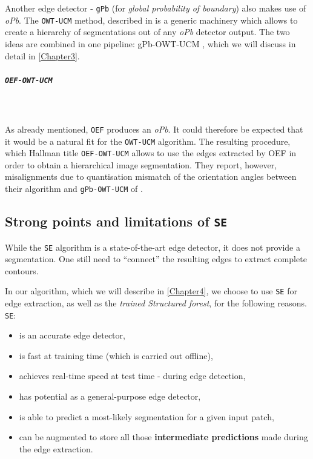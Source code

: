 Another edge detector - {\tt gPb} (for {\it global probability of boundary}) \cite{Maire2008using} also makes use of {\it oPb}. The {\tt OWT-UCM} method, described in \cite{Arbelaez09} is a generic machinery which allows to create a hierarchy of segmentations out of any {\it oPb} detector output. The two ideas are combined in one pipeline: gPb-OWT-UCM \cite{Arbelaez11}, which we will discuss %
in detail in \cref{Chapter3}. 

\subparagraph{{\tt OEF-OWT-UCM}}\mbox{}\\\mbox{}\\
As already mentioned, {\tt OEF} produces an {\it oPb}. It could therefore be expected that it would be a natural fit for the {\tt OWT-UCM} algorithm. The resulting procedure, which Hallman \etal title {\tt OEF-OWT-UCM} allows to use the edges extracted by OEF %
in order to obtain a hierarchical image segmentation. They report, however, misalignments due to quantisation mismatch of the orientation angles between their algorithm and {\tt gPb-OWT-UCM} of \cite{Arbelaez11}.

\subsection{Strong points and limitations of {\tt SE}}
While the {\tt SE} algorithm is a state-of-the-art edge detector, it does not provide a segmentation. One still need to ``connect'' the resulting edges to extract complete contours. %

In our algorithm, which we will describe in \cref{Chapter4}, we choose to use {\tt SE} for edge extraction, as well as %
the {\it trained Structured forest}, for the following reasons. {\tt SE}:
\begin{itemize}
 \item is an accurate edge detector,
 \item is fast at training time (which is carried out %
 offline),
 \item achieves real-time speed at test time - during edge detection,
 \item has potential as a general-purpose edge detector, %
 \item is able to predict a most-likely segmentation for a given input patch,
 \item can be augmented to store all those {\bf intermediate predictions} made during the edge extraction.
\end{itemize}

